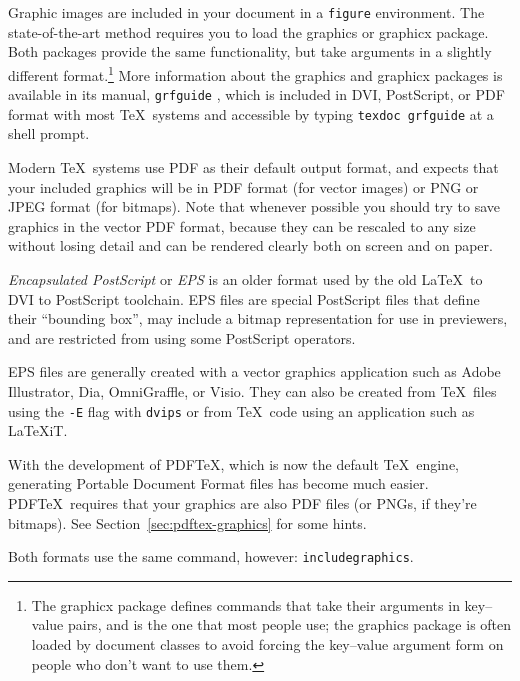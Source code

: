 \documentclass{icmmcm}
\newcommand{\bslash}{\symbol{'134}}%
\newcommand{\bsl}{{\texttt{\bslash}}}
\newcommand{\com}[1]{\bsl\texttt{#1}\xspace}
\newcommand{\package}[1]{\textsf{#1}\xspace}
\newcommand{\env}[1]{\texttt{#1}\xspace}
\newcommand{\prog}[1]{\texttt{#1}\xspace}
\begin{document}
{Graphic images are included in your document in a \env{figure}
environment.  The state-of-the-art method requires you to load the
\package{graphics} or \package{graphicx} package.  Both packages
provide the same functionality, but take arguments in a slightly
different format.\footnote{The \package{graphicx} package defines
  commands that take their arguments in key--value pairs, and is
  the one that most people use; the \package{graphics} package is
  often loaded by document classes to avoid forcing the key--value
  argument form on people who don't want to use them.}  More
information about the \package{graphics} and \package{graphicx}
packages is available in its manual, \texttt{grfguide}
\cite{carlisle-grfguide}, which is included in DVI, PostScript, or
PDF format with most \TeX\ systems and accessible by typing
\texttt{texdoc grfguide} at a shell prompt.

Modern \TeX\ systems use PDF as their default output format, and
expects that your included graphics will be in PDF format (for
vector images) or PNG or JPEG format (for bitmaps).  Note that
whenever possible you should try to save graphics in the vector
PDF format, because they can be rescaled to any size without
losing detail and can be rendered clearly both on screen and on
paper.

\emph{Encapsulated PostScript} or \emph{EPS} is an older format
used by the old \LaTeX\ to DVI to PostScript toolchain.  EPS files
are special PostScript files that define their ``bounding box'',
may include a bitmap representation for use in previewers, and are
restricted from using some PostScript operators.

EPS files are generally created with a vector graphics application
such as Adobe Illustrator, Dia, OmniGraffle, or Visio.  They can also
be created from \TeX\ files using the \texttt{-E} flag with
\prog{dvips} or from \TeX\ code using an application such as
\LaTeX{}iT.

With the development of PDF\TeX, which is now the default \TeX\
engine, generating Portable Document Format files has become much
easier.  PDF\TeX\ requires that your graphics are also PDF files
(or PNGs, if they're bitmaps).  See
Section~\ref{sec:pdftex-graphics} for some hints.

Both formats use the same command, however: \com{includegraphics}.

}
\end{document}
